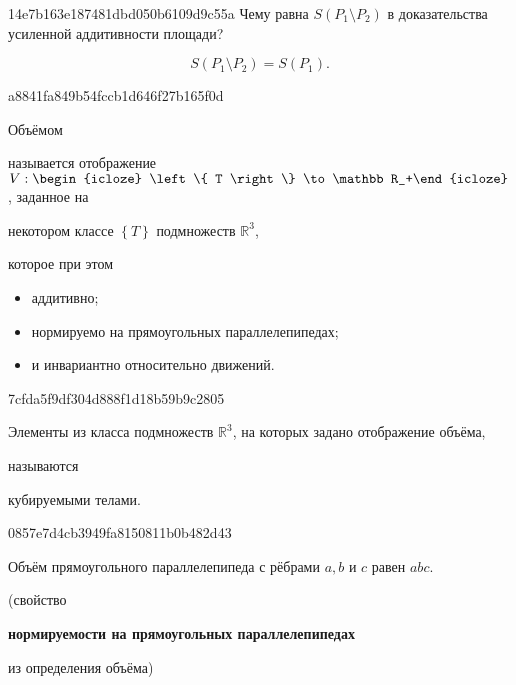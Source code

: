 \begin{note}{14e7b163e187481dbd050b6109d9c55a}
    Чему равна \({ S(P_1 \setminus P_2) }\) в доказательства усиленной аддитивности площади?

    \begin{cloze}{1}
        \[
            S(P_1 \setminus P_2) = S(P_1).
        \]
    \end{cloze}
\end{note}

\begin{note}{a8841fa849b54fccb1d646f27b165f0d}
    \begin{icloze}{3}Объёмом\end{icloze} называется отображение \({ V : \begin{icloze}{1}\left\{ T \right\} \to \mathbb R_+\end{icloze} }\), заданное на \begin{icloze}{4}некотором классе \({ \left\{ T \right\} }\) подмножеств \({ \mathbb R^3 }\),\end{icloze} которое при этом
    \begin{icloze}{2}
        \begin{itemize}
            \item аддитивно;
            \item нормируемо на прямоугольных параллелепипедах;
            \item и инвариантно относительно движений.
        \end{itemize}
    \end{icloze}
\end{note}

\begin{note}{7cfda5f9df304d888f1d18b59b9c2805}
    \begin{icloze}{2}Элементы из класса подмножеств \({ \mathbb R^3 }\), на которых задано отображение объёма,\end{icloze} называются \begin{icloze}{1}кубируемыми телами.\end{icloze}
\end{note}

\begin{note}{0857e7d4cb3949fa8150811b0b482d43}
    \begin{icloze}{1}Объём прямоугольного параллелепипеда с рёбрами \({ a, b }\) и \({ c }\) равен \({ a b c }\).\end{icloze}

    \begin{center}
        \tiny
        (свойство \begin{icloze}{2}\textbf{нормируемости на прямоугольных параллелепипедах}\end{icloze} из определения объёма)
    \end{center}
\end{note}


